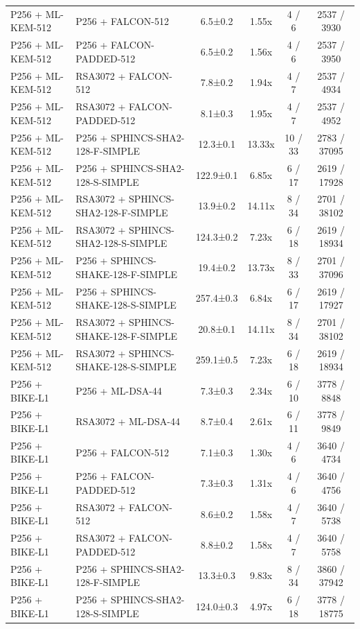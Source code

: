 \documentclass[10pt]{article}
\begin{document}
\begin{tabular}{@{}l l c c c c@{}}
P256 + ML-KEM-512 & P256 + FALCON-512 & 6.5±0.2 & 1.55x & 4 / 6 & 2537 / 3930 \\
P256 + ML-KEM-512 & P256 + FALCON-PADDED-512 & 6.5±0.2 & 1.56x & 4 / 6 & 2537 / 3950 \\
P256 + ML-KEM-512 & RSA3072 + FALCON-512 & 7.8±0.2 & 1.94x & 4 / 7 & 2537 / 4934 \\
P256 + ML-KEM-512 & RSA3072 + FALCON-PADDED-512 & 8.1±0.3 & 1.95x & 4 / 7 & 2537 / 4952 \\
P256 + ML-KEM-512 & P256 + SPHINCS-SHA2-128-F-SIMPLE & 12.3±0.1 & 13.33x & 10 / 33 & 2783 / 37095 \\
P256 + ML-KEM-512 & P256 + SPHINCS-SHA2-128-S-SIMPLE & 122.9±0.1 & 6.85x & 6 / 17 & 2619 / 17928 \\
P256 + ML-KEM-512 & RSA3072 + SPHINCS-SHA2-128-F-SIMPLE & 13.9±0.2 & 14.11x & 8 / 34 & 2701 / 38102 \\
P256 + ML-KEM-512 & RSA3072 + SPHINCS-SHA2-128-S-SIMPLE & 124.3±0.2 & 7.23x & 6 / 18 & 2619 / 18934 \\
P256 + ML-KEM-512 & P256 + SPHINCS-SHAKE-128-F-SIMPLE & 19.4±0.2 & 13.73x & 8 / 33 & 2701 / 37096 \\
P256 + ML-KEM-512 & P256 + SPHINCS-SHAKE-128-S-SIMPLE & 257.4±0.3 & 6.84x & 6 / 17 & 2619 / 17927 \\
P256 + ML-KEM-512 & RSA3072 + SPHINCS-SHAKE-128-F-SIMPLE & 20.8±0.1 & 14.11x & 8 / 34 & 2701 / 38102 \\
P256 + ML-KEM-512 & RSA3072 + SPHINCS-SHAKE-128-S-SIMPLE & 259.1±0.5 & 7.23x & 6 / 18 & 2619 / 18934 \\
P256 + BIKE-L1 & P256 + ML-DSA-44 & 7.3±0.3 & 2.34x & 6 / 10 & 3778 / 8848 \\
P256 + BIKE-L1 & RSA3072 + ML-DSA-44 & 8.7±0.4 & 2.61x & 6 / 11 & 3778 / 9849 \\
P256 + BIKE-L1 & P256 + FALCON-512 & 7.1±0.3 & 1.30x & 4 / 6 & 3640 / 4734 \\
P256 + BIKE-L1 & P256 + FALCON-PADDED-512 & 7.3±0.3 & 1.31x & 4 / 6 & 3640 / 4756 \\
P256 + BIKE-L1 & RSA3072 + FALCON-512 & 8.6±0.2 & 1.58x & 4 / 7 & 3640 / 5738 \\
P256 + BIKE-L1 & RSA3072 + FALCON-PADDED-512 & 8.8±0.2 & 1.58x & 4 / 7 & 3640 / 5758 \\
P256 + BIKE-L1 & P256 + SPHINCS-SHA2-128-F-SIMPLE & 13.3±0.3 & 9.83x & 8 / 34 & 3860 / 37942 \\
P256 + BIKE-L1 & P256 + SPHINCS-SHA2-128-S-SIMPLE & 124.0±0.3 & 4.97x & 6 / 18 & 3778 / 18775 \\

\end{tabular}
\end{document}

